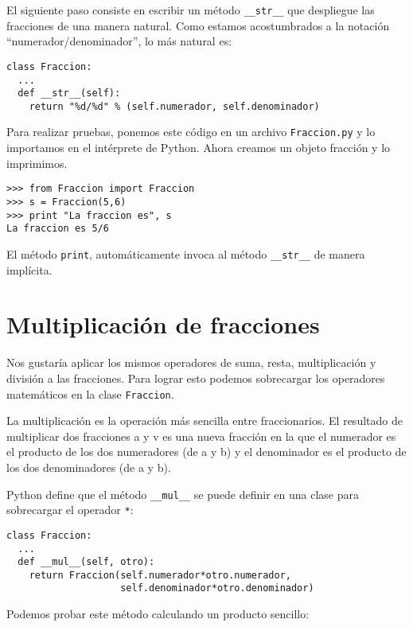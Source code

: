 El siguiente paso consiste en escribir un método \texttt{\_\_str\_\_} que despliegue las fracciones de 
una manera natural. Como estamos acostumbrados a la notación
``numerador/denominador'', lo más natural es:

\beforeverb
\begin{verbatim}
class Fraccion:
  ...
  def __str__(self):
    return "%d/%d" % (self.numerador, self.denominador)
\end{verbatim}
\afterverb
%
Para realizar pruebas, ponemos este código en un archivo
\texttt{Fraccion.py} y lo importamos en el intérprete
de Python. Ahora creamos un objeto fracción y lo imprimimos.

\beforeverb
\begin{verbatim}
>>> from Fraccion import Fraccion
>>> s = Fraccion(5,6)
>>> print "La fraccion es", s
La fraccion es 5/6
\end{verbatim}
\afterverb
%
El método \texttt{print}, automáticamente invoca al método 
\texttt{\_\_str\_\_} de manera implícita.


\section {Multiplicación de fracciones}

Nos gustaría aplicar los mismos operadores de suma, resta, 
multiplicación y división a las fracciones. Para lograr esto
podemos sobrecargar los operadores matemáticos en la clase
\texttt{Fraccion}.


La multiplicación es la operación más sencilla entre fraccionarios. El
resultado de multiplicar dos fracciones a y v es una nueva fracción en la que el numerador es el producto de los dos numeradores (de a y b) y el denominador es el producto de los dos denominadores (de a y b). 

Python define que  el método  \texttt{\_\_mul\_\_} se puede definir
en una clase para sobrecargar el operador \texttt{*}:

\beforeverb
\begin{verbatim}
class Fraccion:
  ...
  def __mul__(self, otro):
    return Fraccion(self.numerador*otro.numerador,
                    self.denominador*otro.denominador)
\end{verbatim}
\afterverb
%
Podemos probar este método calculando un producto sencillo:

